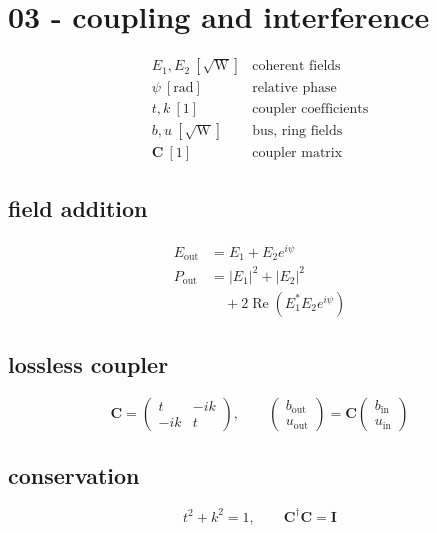 \section*{03 - coupling and interference}

\[
\begin{array}{ll}E_1,E_2\ [\sqrt{\mathrm W}]&\text{coherent fields}\\[0.6em]\psi\ [\mathrm{rad}]&\text{relative phase}\\[0.6em]t,k\ [1]&\text{coupler coefficients}\\[0.6em]b,u\ [\sqrt{\mathrm W}]&\text{bus, ring fields}\\[0.6em]\mathbf C\ [1]&\text{coupler matrix}\end{array}
\]

\subsection*{field addition}
\[
\displaystyle \begin{aligned}E_{\mathrm{out}}&=E_1+E_2e^{i\psi}\\P_{\mathrm{out}}&=|E_1|^2+|E_2|^2\\&\quad+2\operatorname{Re}\!\left(E_1^*E_2e^{i\psi}\right)\end{aligned}
\]

\subsection*{lossless coupler}
\[
\displaystyle \mathbf C=\begin{pmatrix}t&-ik\\-ik&t\end{pmatrix},\qquad\begin{pmatrix}b_{\mathrm{out}}\\u_{\mathrm{out}}\end{pmatrix}=\mathbf C\begin{pmatrix}b_{\mathrm{in}}\\u_{\mathrm{in}}\end{pmatrix}
\]

\subsection*{conservation}
\[
\displaystyle t^2+k^2=1,\qquad \mathbf C^{\dagger}\mathbf C=\mathbf I
\]
